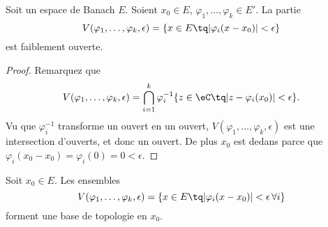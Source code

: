 \begin{lemma}			\label{LEMooEFVXooIWBBdW}
	Soit un espace de Banach \( E\). Soient \( x_0\in E\), \( \varphi_1,\ldots, \varphi_k\in E'\). La partie
	\begin{equation}
		V(\varphi_1,\ldots, \varphi_k,\epsilon)=\{ x\in E\tq | \varphi_i(x-x_0) |<\epsilon \}
	\end{equation}
	est faiblement ouverte.
\end{lemma}

\begin{proof}
	Remarquez que
	\begin{equation}
		V(\varphi_1,\ldots, \varphi_k,\epsilon)=\bigcap_{i=1}^k\varphi_i^{-1}\{ z\in \eC\tq | z-\varphi_i(x_0) | <\epsilon \}.
	\end{equation}
	Vu que \( \varphi_i^{-1}\) transforme un ouvert en un ouvert, \( V(\varphi_1,\ldots, \varphi_k,\epsilon)\) est une intersection d'ouverts, et donc un ouvert. De plus \( x_0\) est dedans parce que \( \varphi_i(x_0-x_0)=\varphi_i(0)=0 <\epsilon\).
\end{proof}

\begin{lemma}
	Soit \( x_0\in E\). Les ensembles
	\begin{equation}
		V(\varphi_1,\ldots, \varphi_k,\epsilon)=\{ x\in E\tq | \varphi_i(x-x_0) |<\epsilon\,\forall i \}
	\end{equation}
	forment une base de topologie en \( x_0\).
\end{lemma}

